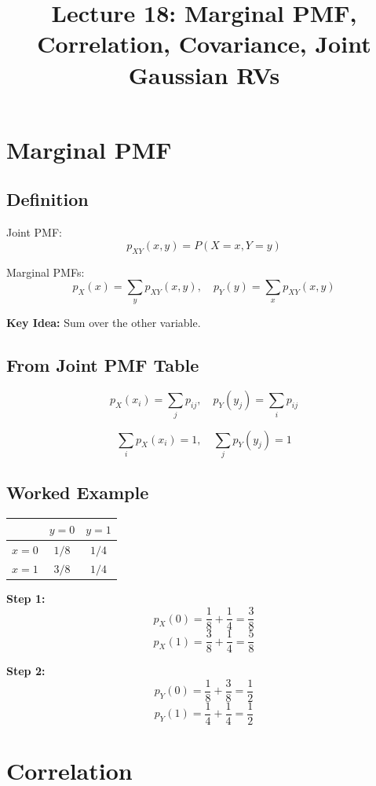 \documentclass[11pt]{article}
\begin{document}
\title{Lecture 18: Marginal PMF, Correlation, Covariance, Joint Gaussian RVs}
\date{}
\maketitle

\section{Marginal PMF}

\subsection{Definition}
Joint PMF:
\[
p_{XY}(x,y) = P(X=x, Y=y)
\]

Marginal PMFs:
\[
p_X(x) = \sum_y p_{XY}(x,y), \quad
p_Y(y) = \sum_x p_{XY}(x,y)
\]

\textbf{Key Idea:} Sum over the other variable.

\subsection{From Joint PMF Table}
\[
p_X(x_i) = \sum_j p_{ij}, \quad
p_Y(y_j) = \sum_i p_{ij}
\]

\[
\sum_i p_X(x_i) = 1, \quad
\sum_j p_Y(y_j) = 1
\]

\subsection{Worked Example}
\begin{center}
\begin{tabular}{c|cc}
\toprule
 & $y=0$ & $y=1$ \\
\midrule
$x=0$ & $1/8$ & $1/4$ \\
$x=1$ & $3/8$ & $1/4$ \\
\bottomrule
\end{tabular}
\end{center}

\textbf{Step 1:}
\[
p_X(0) = \frac{1}{8} + \frac{1}{4} = \frac{3}{8}
\]
\[
p_X(1) = \frac{3}{8} + \frac{1}{4} = \frac{5}{8}
\]

\textbf{Step 2:}
\[
p_Y(0) = \frac{1}{8} + \frac{3}{8} = \frac{1}{2}
\]
\[
p_Y(1) = \frac{1}{4} + \frac{1}{4} = \frac{1}{2}
\]

\section{Correlation}
\end{document}
